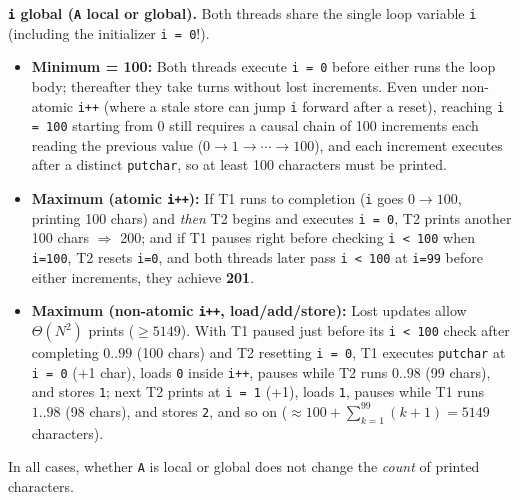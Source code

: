 \documentclass[11pt,a4paper]{article}
\newenvironment{Sol}{%
  \begin{tcolorbox}[sboxstyle, title={Solution}]%
}{%
  \end{tcolorbox}\vspace{0.35em}%
}
\begin{document}
\begin{Sol}
\textbf{\texttt{i} global (\texttt{A} local or global).} Both threads share the single loop variable \texttt{i} (including the initializer \texttt{i = 0}!).
\begin{itemize}
  \item \textbf{Minimum = 100:} Both threads execute \texttt{i = 0} before either runs the loop body; thereafter they take turns without lost increments. Even under non-atomic \texttt{i++} (where a stale store can jump \texttt{i} forward after a reset), reaching \texttt{i = 100} starting from 0 still requires a causal chain of 100 increments each reading the previous value ($0\to 1\to\cdots\to 100$), and each increment executes after a distinct \texttt{putchar}, so at least 100 characters must be printed.
  \item \textbf{Maximum (atomic \texttt{i++}):} If T1 runs to completion (\texttt{i} goes $0\to 100$, printing 100 chars) and \emph{then} T2 begins and executes \texttt{i = 0}, T2 prints another 100 chars $\Rightarrow$ 200; and if T1 pauses right before checking \texttt{i < 100} when \texttt{i=100}, T2 resets \texttt{i=0}, and both threads later pass \texttt{i < 100} at \texttt{i=99} before either increments, they achieve \textbf{201}.
  \item \textbf{Maximum (non-atomic \texttt{i++}, load/add/store):} Lost updates allow $\Theta(N^2)$ prints ($\ge 5149$). With T1 paused just before its \texttt{i < 100} check after completing $0..99$ (100 chars) and T2 resetting \texttt{i = 0}, T1 executes \texttt{putchar} at \texttt{i = 0} (+1 char), loads \texttt{0} inside \texttt{i++}, pauses while T2 runs $0..98$ (99 chars), and stores \texttt{1}; next T2 prints at \texttt{i = 1} (+1), loads \texttt{1}, pauses while T1 runs $1..98$ (98 chars), and stores \texttt{2}, and so on ($\approx 100 + \sum_{k=1}^{99} (k+1) = 5149$ characters).
\end{itemize}
In all cases, whether \texttt{A} is local or global does not change the \emph{count} of printed characters.
\end{Sol}
\end{document}

